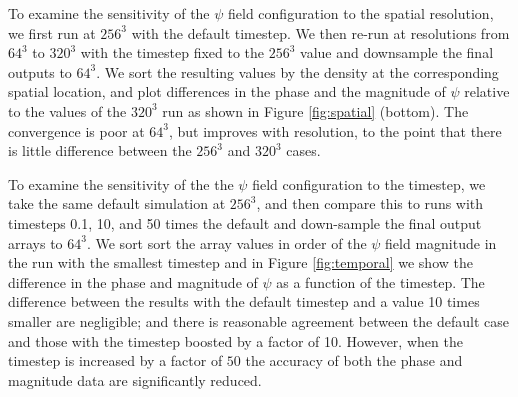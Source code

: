 \documentclass[a4paper,11pt]{article}
\begin{document}
To examine the sensitivity of the  $\psi$ field configuration to the spatial resolution, we first run at $256^3$ with the default timestep. We then re-run  at resolutions  from $64^3$ to $320^3$ with the timestep fixed to the  $256^3$ value and downsample the final outputs to $64^3$. We  sort the resulting values by  the density at the corresponding spatial location, and plot differences in the phase and the magnitude of $\psi$ relative to the values of the $320^3$ run as shown in Figure \ref{fig:spatial} (bottom).  The convergence is poor at $64^3$, but improves with resolution, to the point that there is little difference between the  $256^3$ and $320^3$ cases.

To examine the sensitivity of the the  $\psi$ field configuration to the timestep, we take the same default simulation at $256^3$, and then compare this to runs with timesteps 0.1, 10, and 50 times the default and down-sample the final output arrays to $64^3$. We sort sort the array values in order of the $\psi$ field magnitude in the run with the smallest timestep and in Figure \ref{fig:temporal}  we show the difference in the phase and magnitude of $\psi$ as a function of the timestep.  The difference between the results with the default timestep and a value 10 times smaller are negligible; and there is reasonable agreement between the default case and those with the timestep boosted by a factor of 10. However, when the timestep is increased by a factor of $50$ the accuracy of both the phase and magnitude data are significantly reduced.
\end{document}

